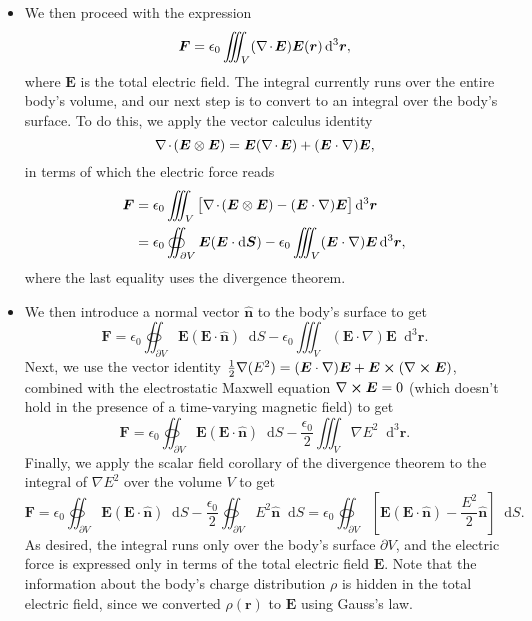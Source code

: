 \documentclass[11pt, a4paper]{article}
\newcommand{\diff}{\mathop{}\!\mathrm{d}} %
\newcommand{\dr}{\diff^{3} \r}  %
\renewcommand{\vec}[1]{\bm{#1}} %
\newcommand{\uvec}[1]{\hat{\vec{#1}}} %
\renewcommand{\r}{\vec{r}}
\newcommand{\E}{\vec{E}} %
\newcommand{\ee}{\epsilon_{0}}  %
\renewcommand{\div}{\nabla \mspace{-2mu} \cdot \mspace{-2mu}}
\renewcommand{\curl}{\nabla \cross}
\renewcommand{\grad}{\nabla}
\begin{document}
\begin{itemize}
    \item We then proceed with the expression
	\begin{equation*}
		\vec{F} = \ee \iiint_{V} (\div \E) \E(\r) \dr,
	\end{equation*}
	where $ \E $ is the total electric field. The integral currently runs over the entire body's volume, and our next step is to convert to an integral over the body's surface. To do this, we apply the vector calculus identity
	\begin{equation*}
		\div (\E \otimes \E) = \E (\div \E) + (\E \cdot \grad) \E,
	\end{equation*}
	in terms of which the electric force reads
	\begin{align*}
		\vec{F} &= \ee \iiint_{V} \big[\div (\E \otimes \E) - (\E \cdot \grad) \E \big] \dr \\
		& = \ee \oiint_{\partial V} \E(\E \cdot \diff \vec{S}) - \ee \iiint_{V}(\E \cdot \grad)\E \dr,
	\end{align*}
	where the last equality uses the divergence theorem. 
	
	\item We then introduce a normal vector $ \uvec{n} $ to the body's surface to get
	\begin{equation*}
		\vec{F} = \ee \oiint_{\partial V} \E (\E \cdot \uvec{n}) \diff S - \ee \iiint_{V} (\E \cdot \grad)\E \dr.
	\end{equation*}
	Next, we use the vector identity $ \frac{1}{2} \grad (E^{2}) = (\E \cdot \grad)\E + \E \cross (\curl \E) $, combined with the electrostatic Maxwell equation $ \curl \E = 0 $ (which doesn't hold in the presence of a time-varying magnetic field) to get
	\begin{equation*}
		\vec{F} = \ee \oiint_{\partial V} \E (\E \cdot \uvec{n}) \diff S - \frac{\ee}{2} \iiint_{V} \grad E^{2}\dr.
	\end{equation*}
	Finally, we apply the scalar field corollary of the divergence theorem to the integral of $ \grad E^{2} $ over the volume $ V $ to get
	\begin{equation*}
		\vec{F} = \ee \oiint_{\partial V} \E (\E \cdot \uvec{n}) \diff S - \frac{\ee}{2} \oiint_{\partial V}E^{2}\uvec{n} \diff S = \ee \oiint_{\partial V} \left[\E(\E\cdot \uvec{n}) - \frac{E^{2}}{2}\uvec{n} \right] \diff S.
	\end{equation*}
	As desired, the integral runs only over the body's surface $ \partial V $, and the electric force is expressed only in terms of the total electric field $ \E $. Note that the information about the body's charge distribution $ \rho $ is hidden in the total electric field, since we converted $ \rho(\r) $ to $ \E $ using Gauss's law.
	
\end{itemize}
\end{document}
